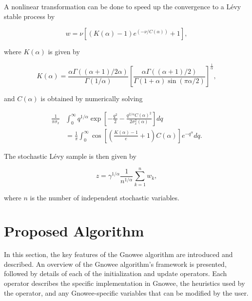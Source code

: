 \documentclass{article}                                                                           %
\begin{document}
\noindent A nonlinear transformation can be done to speed up the convergence to a Lévy stable process by

\begin{equation}
  w=\nu \left[ (K(\alpha)-1) e^{(-\nu/C(\alpha))}+1 \right],
\end{equation}

\noindent where $K(\alpha)$ is given by

\begin{equation}
  K(\alpha)= \frac{\alpha \Gamma((\alpha+1)/2\alpha)}{\Gamma(1/\alpha)} \left[ \frac{\alpha \Gamma((\alpha+1)/2)}{\Gamma(1+\alpha)\sin(\pi \alpha/2)} \right]^{\frac{1}{\alpha}},
\end{equation}   

\noindent and $C(\alpha)$ is obtained by numerically solving  

\begin{align}
  \frac{1}{\pi \sigma_x}&\int^{\infty}_0 q^{1/\alpha}\exp \left[-\frac{q^2}{2}-\frac{q^{2/\alpha}C(\alpha)^2}{2\sigma_x^2(\alpha)} \right] dq \nonumber \\ 
  &=\frac{1}{\pi} \int^{\infty}_0 \cos \left[ \left( \frac{K(\alpha)-1}{e}+1 \right)C(\alpha) \right] e^{-q^{\alpha}} dq.
\end{align}

\noindent The stochastic Lévy sample is then given by 

\begin{equation}  \label{eq:Levy_6}
  z=\gamma^{1/\alpha} \frac{1}{n^{1/\alpha}}\sum^n_{k=1}w_k,
\end{equation}

\noindent where $n$ is the number of independent stochastic variables. 
 
\section{Proposed Algorithm} \label{sec:algorithm}
In this section, the key features of the Gnowee algorithm are introduced and described. 
An overview of the Gnowee algorithm's framework is presented, followed by details of each of the initialization and update operators.
Each operator describes the specific implementation in Gnowee, the heuristics used by the operator, and any Gnowee-specific variables that can be modified by the user. 
\end{document}

